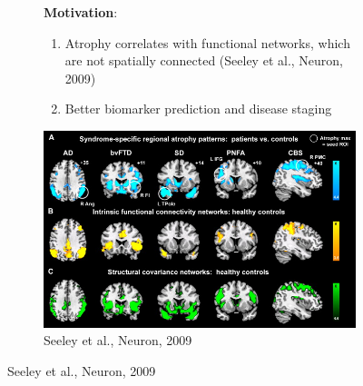\documentclass[8pt,xcolor=table]{beamer}
\begin{document}
\begin{frame}

\begin{figure}
\begin{subfigure}{0.48\textwidth}
\textbf{Motivation}:
\begin{enumerate}
\item Atrophy correlates with functional networks, which are not spatially connected (Seeley et al., Neuron, 2009)
\vspace{2em}
\item Better biomarker prediction and disease staging
\end{enumerate}
\end{subfigure}
\begin{subfigure}{0.5\textwidth}
\centering 
\includegraphics[width=\textwidth, right, trim=0 85 0 0, clip]{seeley_connectivity_overlap.jpg}
\caption{Seeley et al., Neuron, 2009}
\end{subfigure}

\end{figure}

\vfill

\vspace{-3em}


\end{frame}

\end{document}

